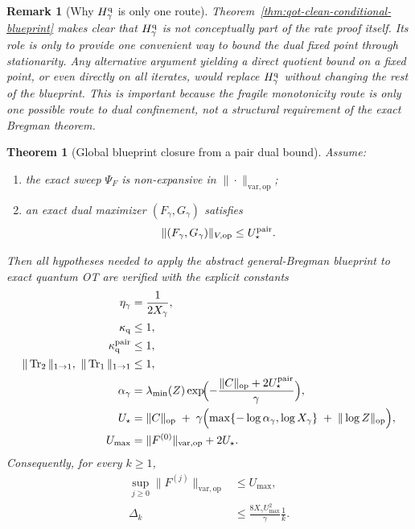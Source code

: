 \documentclass[11pt]{article}
\newcommand{\Trone}{\operatorname{Tr}_{1}}
\newcommand{\Trtwo}{\operatorname{Tr}_{2}}
\newcommand{\op}{\mathrm{op}}
\newcommand{\varop}{\mathrm{var},\op}
\theoremstyle{plain}
\newtheorem{theorem}{Theorem}[section]
\newtheorem{remark}{Remark}[section]
\begin{document}
\begin{remark}[Why $H_\gamma^{\rm q}$ is only one route]
\label{rem:qot-Hgamma-only-one-route}
Theorem~\ref{thm:qot-clean-conditional-blueprint} makes clear that $H_\gamma^{\rm q}$ is \emph{not} conceptually part of the rate proof itself.
Its role is only to provide one convenient way to bound the dual fixed point through stationarity.
Any alternative argument yielding a direct quotient bound on a fixed point, or even directly on all iterates, would replace $H_\gamma^{\rm q}$ without changing the rest of the blueprint.
This is important because the fragile monotonicity route is only one possible route to dual confinement, not a structural requirement of the exact Bregman theorem.
\end{remark}

\begin{theorem}[Global blueprint closure from a pair dual bound]
\label{thm:qot-global-from-pair-bound}
Assume:
\begin{enumerate}[label=\textnormal{(\roman*)}]
\item the exact sweep $\Psi_F$ is non-expansive in $\|\cdot\|_{\varop}$;
\item an exact dual maximizer $(F_\gamma,G_\gamma)$ satisfies
\[
\|(F_\gamma,G_\gamma)\|_{V,\op}\le U_\star^{\rm pair}.
\]
\end{enumerate}
Then all hypotheses needed to apply the abstract general-Bregman blueprint to exact quantum OT are verified with the explicit constants
\begin{align*}
\eta_\gamma &= \frac{1}{2X_\gamma},\\
\kappa_{\rm q} &\le 1,\\
\kappa_{\rm q}^{\rm pair} &\le 1,\\
\|\Trtwo\|_{1\to 1},\ \|\Trone\|_{1\to 1} &\le 1,\\
\alpha_\gamma
&=
\lambda_{\min}(Z)\exp\!\Bigl(-\frac{\|C\|_{\op}+2U_\star^{\rm pair}}{\gamma}\Bigr),\\
U_\star
&=
\|C\|_{\op}
\;+\;
\gamma\Bigl(
\max\{-\log \alpha_\gamma,\log X_\gamma\}
\;+\;
\|\log Z\|_{\op}
\Bigr),\\
U_{\max} &= \|F^{(0)}\|_{\varop}+2U_\star.
\end{align*}
Consequently, for every $k\ge 1$,
\begin{align}
\sup_{j\ge 0}\|F^{(j)}\|_{\varop}
&\le
U_{\max},
\label{eq:qot-global-from-pair-bound-orbit}\\
\Delta_k
&\le
\frac{8X_\gamma U_{\max}^2}{\gamma}\frac{1}{k}.
\label{eq:qot-global-from-pair-bound-rate}
\end{align}
\end{theorem}
\end{document}
